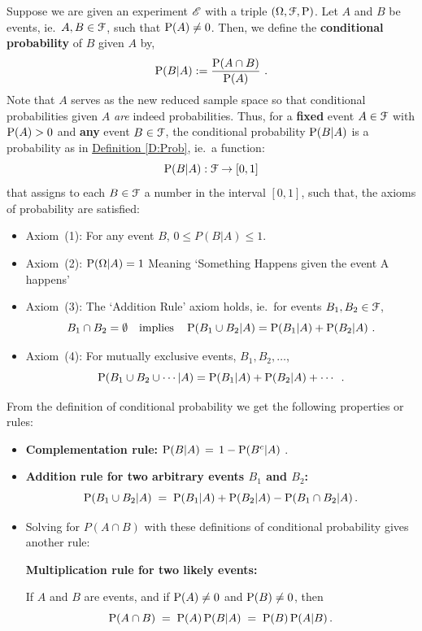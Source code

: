  \begin{definition}\label{D:CondProb}
Suppose we are given an experiment $\EE{E}$ with a triple $(\Omega, \C{F}, \P)$.  Let $A$ and $B$ be events, ie.~$A,B \in \C{F}$, such that $\P(A) \neq 0$.  Then, we define the {\bf conditional probability} of $B$ given $A$ by,
 \begin{equation}\label{E:CPD}
 \P(B|A) := \frac{\P(A \cap B)}{\P(A)} \ .
 \end{equation}
Note that $A$ serves as the new reduced sample space so that conditional probabilities given $A$ \emph{are} indeed  probabilities.
Thus, for a {\bf fixed} event $A \in \C{F}$ with $\P(A)>0$ and {\bf any} event $B \in \C{F}$, the conditional  probability $\P(B | A)$ is a probability as in \hyperref[D:Prob]{Definition \ref*{D:Prob}}, ie.~a function:
 \[
 \P(B | A) : \C{F} \rightarrow [0,1]
 \]
 that assigns to each $B \in \C{F}$ a number in the interval $[0,1]$, such that, the axioms of probability are satisfied:
\begin{itemize}
\item[]{Axiom~(1): For any event $B$, $0\leq P(B|A)\leq 1$.}
\item[]{Axiom~(2): $\P(\Omega | A) = 1$ \qquad Meaning `Something Happens given the event A happens'}
\item[]{Axiom~(3): The `Addition Rule' axiom holds, ie.~for events $B_1, B_2 \in \C{F}$,
 \[
 B_1 \cap B_2 = \emptyset \quad \text{implies} \quad \P(B_1 \cup B_2 | A) = \P(B_1 | A) + \P(B_2 |  A)  \ .
 \]}
\item[]{Axiom~(4): For mutually exclusive events, $B_1,B_2, \ldots$,
\[
\P(B_1 \cup B_2 \cup \cdots | A) = \P(B_1|A)+\P(B_2|A)+\cdots \enspace .
\]}
\end{itemize} 
\end{definition}

From the definition of conditional probability we get the following properties or rules:
\begin{itemize}
\item[]{{\bf Complementation rule:} $\P(B | A)\, = \,1 - \P(B^c | A)$ .}
\item[]{{\bf Addition rule for two arbitrary events $B_1$ and $B_2$:} \[{\P(B_1 \cup B_2 | A) \;= \;\P(B_1 | A) + \P(B_2 | A) - \P(B_1\cap B_2|A)}\,.\]}
\item[]{Solving for $P(A\cap B)$ with  these definitions of conditional probability
gives another rule:
\begin{framed}
{\bf Multiplication rule for two likely events:} 

If $A$ and $B$ are events, and if
  $\P(A)\neq 0$ and  $\P(B)\neq 0$, then
\[\P(A\cap B)\;=\;\P(A)\P(B|A)\;=\;\P(B)\P(A|B)\,. \]
\end{framed}
}
\end{itemize}

